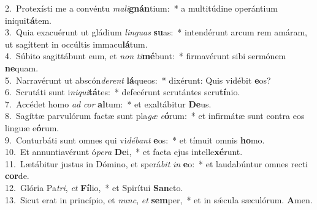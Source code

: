 {2.~}Protexísti me a convéntu \textit{ma}\textit{li}\textbf{gnán}tium:~* a multitúdine operántium iniqui\textbf{tá}tem.\\
{3.~}Quia exacuérunt ut gládium \textit{lin}\textit{guas} \textbf{su}as:~* intendérunt arcum rem amáram, ut sagíttent in occúltis immacu\textbf{lá}tum.\\
{4.~}Súbito sagittábunt eum, et \textit{non} \textit{ti}\textbf{mé}bunt:~* firmavérunt sibi sermónem \textbf{ne}quam.\\
{5.~}Narravérunt ut abscón\textit{de}\textit{rent} \textbf{lá}queos:~* dixérunt: Quis vidébit \textbf{e}os?\\
{6.~}Scrutáti sunt i\textit{ni}\textit{qui}\textbf{tá}tes:~* defecérunt scrutántes scru\textbf{tí}nio.\\
{7.~}Accédet homo \textit{ad} \textit{cor} \textbf{al}tum:~* et exaltábitur \textbf{De}us.\\
{8.~}Sagíttæ parvulórum factæ sunt pla\textit{gæ} \textit{e}\textbf{ó}rum:~* et infirmátæ sunt contra eos linguæ e\textbf{ó}rum.\\
{9.~}Conturbáti sunt omnes qui vi\textit{dé}\textit{bant} \textbf{e}os:~* et tímuit omnis \textbf{ho}mo.\\
{10.~}Et annuntiavérunt ó\textit{pe}\textit{ra} \textbf{De}i,~* et facta ejus intelle\textbf{xé}runt.\\
{11.~}Lætábitur justus in Dómino, et sperá\textit{bit} \textit{in} \textbf{e}o:~* et laudabúntur omnes recti \textbf{cor}de.\\
{12.~}Glória Pa\textit{tri}, \textit{et} \textbf{Fí}lio,~* et Spirítui \textbf{San}cto.\\
{13.~}Sicut erat in princípio, et \textit{nunc}, \textit{et} \textbf{sem}per,~* et in sǽcula sæculórum. \textbf{A}men.\\
